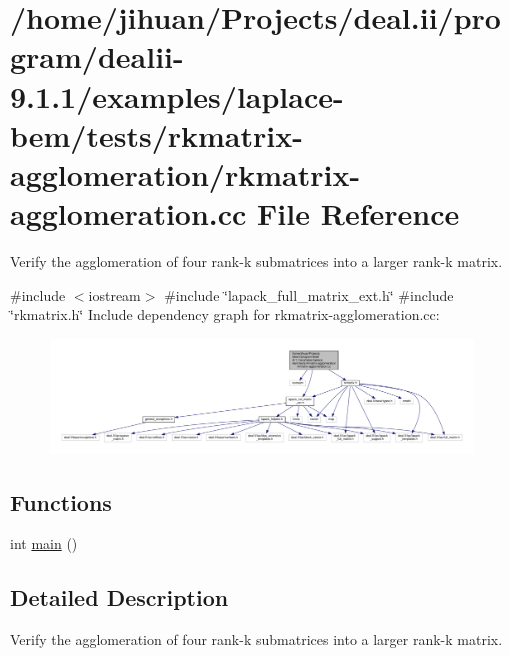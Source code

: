 \hypertarget{rkmatrix-agglomeration_8cc}{}\section{/home/jihuan/\+Projects/deal.ii/program/dealii-\/9.1.1/examples/laplace-\/bem/tests/rkmatrix-\/agglomeration/rkmatrix-\/agglomeration.cc File Reference}
\label{rkmatrix-agglomeration_8cc}


Verify the agglomeration of four rank-\/k submatrices into a larger rank-\/k matrix.  


{\ttfamily \#include $<$iostream$>$}\newline
{\ttfamily \#include \char`\"{}lapack\+\_\+full\+\_\+matrix\+\_\+ext.\+h\char`\"{}}\newline
{\ttfamily \#include \char`\"{}rkmatrix.\+h\char`\"{}}\newline
Include dependency graph for rkmatrix-\/agglomeration.cc\+:
\nopagebreak
\begin{figure}[H]
\begin{center}
\leavevmode
\includegraphics[width=350pt]{rkmatrix-agglomeration_8cc__incl}
\end{center}
\end{figure}
\subsection*{Functions}
\begin{DoxyCompactItemize}
\item 
int \hyperlink{rkmatrix-agglomeration_8cc_ae66f6b31b5ad750f1fe042a706a4e3d4}{main} ()
\end{DoxyCompactItemize}


\subsection{Detailed Description}
Verify the agglomeration of four rank-\/k submatrices into a larger rank-\/k matrix. 

